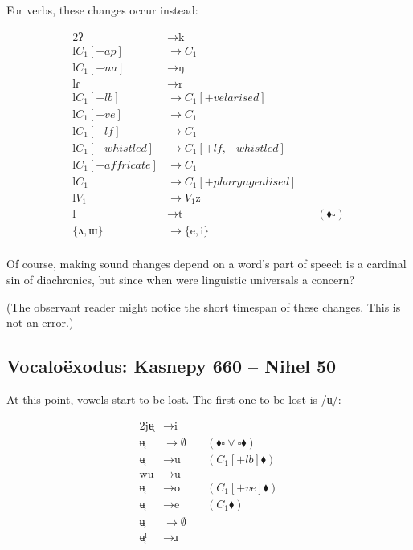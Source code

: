 \documentclass{book}
\begin{document}
For verbs, these changes occur instead:

\begin{alignat*}{2}
  \text{ʔ} &\rightarrow \text{k} \\
  \text{l} C_1[+ap] &\rightarrow C_1 \\
  \text{l} C_1[+na] &\rightarrow \text{ŋ} \\
  \text{lɾ} &\rightarrow \text{r} \\
  \text{l} C_1[+lb] &\rightarrow C_1[+velarised] \\
  \text{l} C_1[+ve] &\rightarrow C_1 \\
  \text{l} C_1[+lf] &\rightarrow C_1 \\
  \text{l} C_1[+whistled] &\rightarrow C_1[+lf, -whistled] \\
  \text{l} C_1[+affricate] &\rightarrow C_1 \\
  \text{l} C_1 &\rightarrow C_1[+pharyngealised] \\
  \text{l} V_1 &\rightarrow V_1 \text{z} \\
  \text{l} &\rightarrow \text{t}  &\quad(\blacklozenge \square) \\
  \{\text{ʌ}, \text{ɯ}\} &\rightarrow \{\text{e}, \text{i}\} \\
\end{alignat*}

Of course, making sound changes depend on a word's part of speech is a cardinal sin of diachronics, but since when were linguistic universals a concern?

(The observant reader might notice the short timespan of these changes. This is not an error.)

\subsection{Vocaloëxodus: Kasnepy 660 -- Nihel 50}

At this point, vowels start to be lost. The first one to be lost is /ʉ̜/:

\begin{alignat*}{2}
  \text{jʉ̜} &\rightarrow \text{i} \\
  \text{ʉ̜} &\rightarrow \emptyset &\quad(\blacklozenge \square \lor \square \blacklozenge) \\
  \text{ʉ̜} &\rightarrow \text{u} &\quad(C_1[+lb] \blacklozenge) \\
  \text{wu} &\rightarrow \text{u} \\
  \text{ʉ̜} &\rightarrow \text{o} &\quad(C_1[+ve] \blacklozenge) \\
  \text{ʉ̜} &\rightarrow \text{e} &\quad(C_1 \blacklozenge) \\
  \text{ʉ̜} &\rightarrow \emptyset \\
  \text{ʉ̜ˡ} &\rightarrow \text{ɹ}
\end{alignat*}
\end{document}
